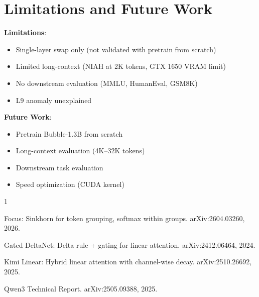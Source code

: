 \documentclass[11pt]{article}
\begin{document}
\section{Limitations and Future Work}

\textbf{Limitations}:
\begin{itemize}
  \item Single-layer swap only (not validated with pretrain from scratch)
  \item Limited long-context (NIAH at 2K tokens, GTX 1650 VRAM limit)
  \item No downstream evaluation (MMLU, HumanEval, GSM8K)
  \item L9 anomaly unexplained
\end{itemize}

\textbf{Future Work}:
\begin{itemize}
  \item Pretrain Bubble-1.3B from scratch
  \item Long-context evaluation (4K--32K tokens)
  \item Downstream task evaluation
  \item Speed optimization (CUDA kernel)
\end{itemize}

\begin{thebibliography}{1}

Focus: Sinkhorn for token grouping, softmax within groups.
\newblock arXiv:2604.03260, 2026.

Gated DeltaNet: Delta rule + gating for linear attention.
\newblock arXiv:2412.06464, 2024.

Kimi Linear: Hybrid linear attention with channel-wise decay.
\newblock arXiv:2510.26692, 2025.

Qwen3 Technical Report.
\newblock arXiv:2505.09388, 2025.

\end{thebibliography}
\end{document}
